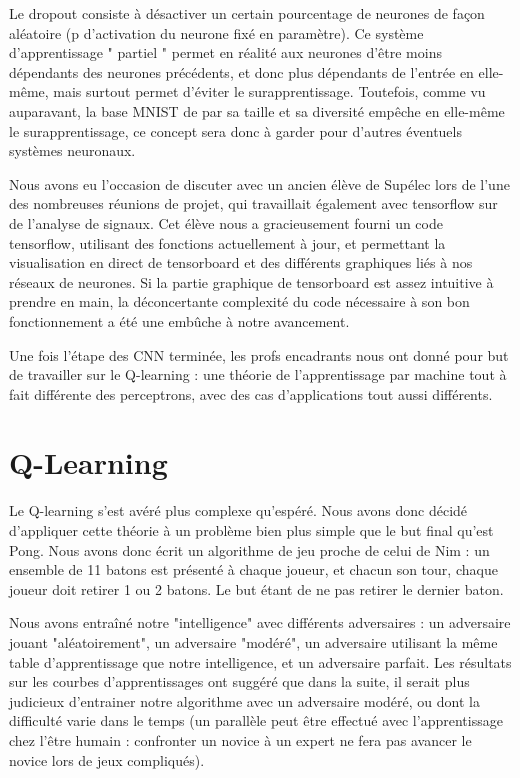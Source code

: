 \documentclass[
    10pt,
    a4paper,
    oneside,
    headinclude,footinclude,
    BCOR=5mm,
    captions=tableabove
]{scrartcl}
\begin{document}
Le dropout consiste à désactiver un certain pourcentage de neurones de façon aléatoire (p d'activation du neurone fixé en paramètre). Ce système d'apprentissage " partiel " permet en réalité aux neurones d'être moins dépendants des neurones précédents, et donc plus dépendants de l'entrée en elle-même, mais surtout permet d'éviter le surapprentissage. Toutefois, comme vu auparavant, la base MNIST de par sa taille et sa diversité empêche en elle-même le surapprentissage, ce concept sera donc à garder pour d'autres éventuels systèmes neuronaux.

Nous avons eu l'occasion de discuter avec un ancien élève de Supélec lors de l'une des nombreuses réunions de projet, qui travaillait également avec tensorflow sur de l'analyse de signaux. Cet élève nous a gracieusement fourni un code tensorflow, utilisant des fonctions actuellement à jour, et permettant la visualisation en direct de tensorboard et des différents graphiques liés à nos réseaux de neurones. Si la partie graphique de tensorboard est assez intuitive à prendre en main, la déconcertante complexité du code nécessaire à son bon fonctionnement a été une embûche à notre avancement.

Une fois l'étape des CNN terminée, les profs encadrants nous ont donné pour but de travailler sur le Q-learning : une théorie de l'apprentissage par machine tout à fait différente des perceptrons, avec des cas d'applications tout aussi différents.

\section{Q-Learning}

Le Q-learning s'est avéré plus complexe qu'espéré. 
Nous avons donc décidé d'appliquer cette théorie  à un problème bien plus simple que le but final qu'est Pong. Nous avons donc écrit un algorithme de jeu proche de celui de Nim : un ensemble de 11 batons est présenté à chaque joueur, et chacun son tour, chaque joueur doit retirer 1 ou 2 batons. Le but étant de ne pas retirer le dernier baton.

Nous avons entraîné notre "intelligence" avec différents adversaires : un adversaire jouant "aléatoirement", un adversaire "modéré", un adversaire utilisant la même table d'apprentissage que notre intelligence, et un adversaire parfait. Les résultats sur les courbes d'apprentissages ont suggéré que dans la suite, il serait plus judicieux d'entrainer notre algorithme avec un adversaire modéré, ou dont la difficulté varie dans le temps (un parallèle peut être effectué avec l'apprentissage chez l'être humain : confronter un novice à un expert ne fera pas avancer le novice lors de jeux compliqués).
\end{document}

